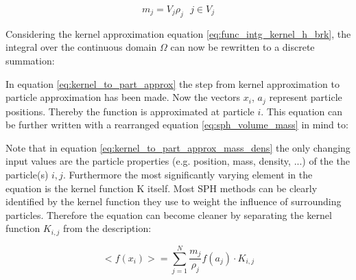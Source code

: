 \begin{equation} \label{eq:sph_volume_mass}
m_{j} = V_{j}\rho_{j} \ \ \ j \in V_{j}
\end{equation}

Considering the kernel approximation equation \ref{eq:func_intg_kernel_h_brk}, the integral over the continuous domain $\Omega$ can now be rewritten to a discrete summation:


In equation \ref{eq:kernel_to_part_approx} the step from kernel approximation to particle approximation has been made. Now the vectors $x_{i}$, $a_{j}$ represent particle positions. Thereby the function is approximated at particle $i$. This equation can be further written with a rearranged equation \ref{eq:sph_volume_mass} in mind to:


Note that in equation \ref{eq:kernel_to_part_approx_mass_dens} the only changing input values are the particle properties (e.g. position, mass, density, ...) of the  the particle(s) $i,j$. Furthermore the most significantly varying element in the equation is the kernel function K itself. Most SPH methods can be clearly identified by the kernel function they use to weight the influence of surrounding particles. Therefore the equation can become cleaner by separating the kernel function $K_{i,j}$ 
from the description:

\begin{equation} 
\label{eq:kernel_to_part_clean}
< f(x_{i}) > =
\sum_{j=1}^{N} \frac{m_{j}}{\rho_{j}}  f(a_{j}) \cdot K_{i,j}
\end{equation}

